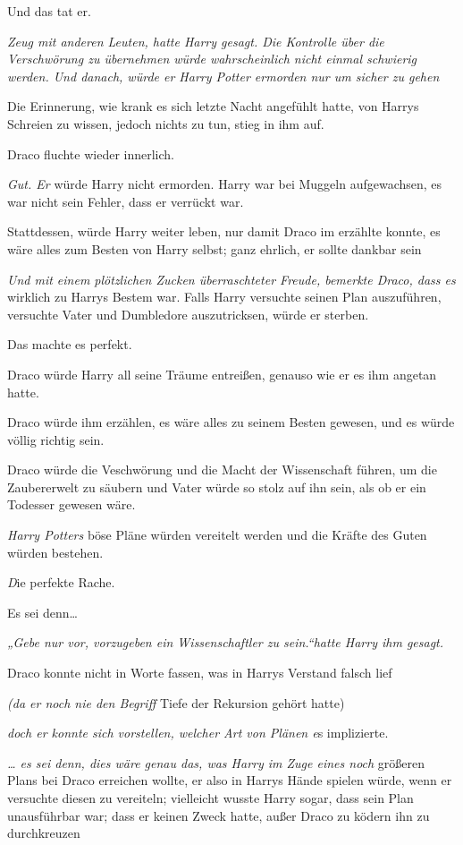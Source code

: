 {Und das tat er.

\emph{Zeug mit anderen Leuten, hatte Harry gesagt. Die Kontrolle über die Verschwörung zu übernehmen würde wahrscheinlich nicht einmal schwierig werden. Und danach, würde er Harry Potter ermorden nur um sicher zu gehen \later}

Die Erinnerung, wie krank es sich letzte Nacht angefühlt hatte, von Harrys Schreien zu wissen, jedoch nichts zu tun, stieg in ihm auf.

Draco fluchte wieder innerlich.

\emph{Gut. Er} würde Harry nicht ermorden. Harry war bei Muggeln aufgewachsen, es war nicht sein Fehler, dass er verrückt war.

Stattdessen, würde Harry weiter leben, nur damit Draco im erzählte konnte, es wäre alles zum Besten von Harry selbst; ganz ehrlich, er sollte dankbar sein \later

\emph{Und mit einem plötzlichen Zucken überraschteter Freude, bemerkte Draco, dass es} wirklich zu Harrys Bestem war. Falls Harry versuchte seinen Plan auszuführen, versuchte Vater und Dumbledore auszutricksen, würde er sterben.

Das machte es perfekt.

Draco würde Harry all seine Träume entreißen, genauso wie er es ihm angetan hatte.

Draco würde ihm erzählen, es wäre alles zu seinem Besten gewesen, und es würde völlig richtig sein.

Draco würde die Veschwörung und die Macht der Wissenschaft führen, um die Zaubererwelt zu säubern und Vater würde so stolz auf ihn sein, als ob er ein Todesser gewesen wäre.

\emph{Harry Potters} böse Pläne würden vereitelt werden und die Kräfte des Guten würden bestehen.

\emph{D}ie perfekte Rache.

Es sei denn…

\emph{„Gebe nur vor, vorzugeben ein Wissenschaftler zu sein.“hatte Harry ihm gesagt.}

Draco konnte nicht in Worte fassen, was in Harrys Verstand falsch lief \later

\emph{(da er noch nie den Begriff} Tiefe der Rekursion gehört hatte)

\emph{\later doch er konnte sich vorstellen, welcher Art von Plänen e}s implizierte.

\emph{… es sei denn, dies wäre genau das, was Harry im Zuge eines noch} größeren Plans bei Draco erreichen wollte, er also in Harrys Hände spielen würde, wenn er versuchte diesen zu vereiteln; vielleicht wusste Harry sogar, dass sein Plan unausführbar war; dass er keinen Zweck hatte, außer Draco zu ködern ihn zu durchkreuzen \later

}
